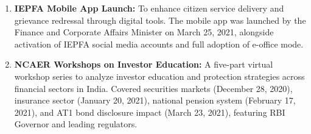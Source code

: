 \documentclass[openany]{book}
\begin{document}
\begin{enumerate}
    \item \textbf{IEPFA Mobile App Launch:} To enhance citizen service delivery and grievance redressal through digital tools. The mobile app was launched by the Finance and Corporate Affairs Minister on March 25, 2021, alongside activation of IEPFA social media accounts and full adoption of e-office mode.
    \item \textbf{NCAER Workshops on Investor Education:} A five-part virtual workshop series to analyze investor education and protection strategies across financial sectors in India. Covered securities markets (December 28, 2020), insurance sector (January 20, 2021), national pension system (February 17, 2021), and AT1 bond disclosure impact (March 23, 2021), featuring RBI Governor and leading regulators.
\end{enumerate}
\end{document}
